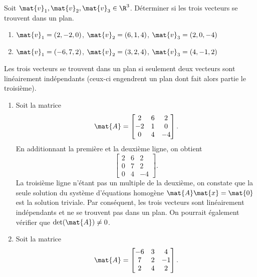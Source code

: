 \begin{exercice}
  Soit $\mat{v}_1, \mat{v}_2, \mat{v}_3 \in \R^3$. Déterminer si
  les trois vecteurs se trouvent dans un plan.
  \begin{enumerate}
  \item $\mat{v}_1 = ( 2, -2,  0)$,
        $\mat{v}_2 = ( 6,  1,  4)$,
        $\mat{v}_3 = ( 2,  0, -4)$
  \item $\mat{v}_1 = (-6,  7,  2)$,
        $\mat{v}_2 = ( 3,  2,  4)$,
        $\mat{v}_3 = ( 4, -1,  2)$
  \end{enumerate}
  \begin{sol}
    Les trois vecteurs se trouvent dans un plan si seulement deux
    vecteurs sont linéairement indépendants (ceux-ci engendrent un
    plan dont fait alors partie le troisième).
    \begin{enumerate}
    \item Soit la matrice
      \begin{displaymath}
        \mat{A} =
        \begin{bmatrix}
          2 & 6 & 2 \\ -2 & 1 & 0 \\ 0 & 4 & -4
        \end{bmatrix}.
      \end{displaymath}
      En additionnant la première et la deuxième ligne, on obtient
      \begin{displaymath}
        \begin{bmatrix}
          2 & 6 & 2 \\ 0 & 7 & 2 \\ 0 & 4 & -4
        \end{bmatrix}.
      \end{displaymath}
      La troisième ligne n'étant pas un multiple de la deuxième, on
      constate que la seule solution du système d'équations homogène
      $\mat{A} \mat{x} = \mat{0}$ est la solution triviale. Par
      conséquent, les trois vecteurs sont linéairement indépendants et
      ne se trouvent pas dans un plan. On pourrait également vérifier
      que $\det(\mat{A}) \neq 0$.
    \item Soit la matrice
      \begin{displaymath}
        \mat{A} =
        \begin{bmatrix}
          -6 & 3 & 4 \\ 7 & 2 & -1 \\ 2 & 4 & 2
        \end{bmatrix}.
      \end{displaymath}

\end{enumerate}
\end{sol}
\end{exercice}

